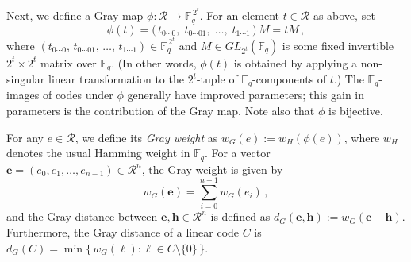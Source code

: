 \documentclass[12pt]{article}
\begin{document}
Next, we define a Gray map $\phi : \mathcal{R} \to \mathbb{F}_q^{\,2^t}$. For an element $t \in \mathcal{R}$ as above, set 
\[
\phi(t) = \big(\, t_{0\cdots0},\; t_{0\cdots01},\; \ldots,\; t_{1\cdots1}\,\big) \, M = t M\,,
\] 
where $(t_{0\cdots0},\, t_{0\cdots01},\, \ldots,\, t_{1\cdots1}) \in \mathbb{F}_q^{\,2^t}$ and $M \in GL_{2^t}(\mathbb{F}_q)$ is some fixed invertible $2^t \times 2^t$ matrix over $\mathbb{F}_q$. (In other words, $\phi(t)$ is obtained by applying a non-singular linear transformation to the $2^t$-tuple of $\mathbb{F}_q$-components of $t$.) The $\mathbb{F}_q$-images of codes under $\phi$ generally have improved parameters; this gain in parameters is the contribution of the Gray map. Note also that $\phi$ is bijective.

For any $e \in \mathcal{R}$, we define its \textit{Gray weight} as $w_G(e) := w_H(\phi(e))$, where $w_H$ denotes the usual Hamming weight in $\mathbb{F}_q$. For a vector $\mathbf{e} = (e_0, e_1, \ldots, e_{n-1}) \in \mathcal{R}^n$, the Gray weight is given by 
\begin{equation}
w_G(\mathbf{e}) = \sum_{i=0}^{n-1} w_G(e_i)\,,
\tag{2.1}
\end{equation}
and the Gray distance between $\mathbf{e}, \mathbf{h} \in \mathcal{R}^n$ is defined as $d_G(\mathbf{e}, \mathbf{h}) := w_G(\mathbf{e} - \mathbf{h})$. Furthermore, the Gray distance of a linear code $C$ is $d_G(C) = \min\{\,w_G(\ell) : \ell \in C \setminus \{0\}\,\}$.
\end{document}
